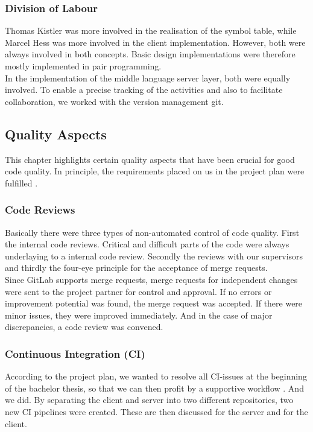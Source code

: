 \subsubsection{Division of Labour}
Thomas Kistler was more involved in the realisation of the symbol table,
while Marcel Hess was more involved in the client implementation.
However, both were always involved in both concepts.
Basic design implementations were therefore mostly implemented in pair programming.\\

In the implementation of the middle language server layer, both were equally involved.
To enable a precise tracking of the activities and also to facilitate collaboration,
we worked with the version management git.

\subsection{Quality Aspects}
This chapter highlights certain quality aspects that have been crucial for good code quality.
In principle, the requirements placed on us in the project plan were fulfilled \cite{projectplan}.

\subsubsection{Code Reviews}
Basically there were three types of non-automated control of code quality.
First the internal code reviews. Critical and difficult parts of the code were always underlaying to a internal code review.
Secondly the reviews with our supervisors and
thirdly the four-eye principle for the acceptance of merge requests. \\

Since GitLab supports merge requests,
merge requests for independent changes were sent to the project partner for control and approval.
If no errors or improvement potential was found, the merge request was accepted.
If there were minor issues, they were improved immediately.
And in the case of major discrepancies, a code review was convened.

\subsubsection{Continuous Integration (CI)}
According to the project plan,
we wanted to resolve all CI-issues at the beginning of the bachelor thesis,
so that we can then profit by a supportive workflow \cite{projectplan}. And we did.
By separating the client and server into two different repositories, two new CI pipelines were created.
These are then discussed for the server and for the client. \\

